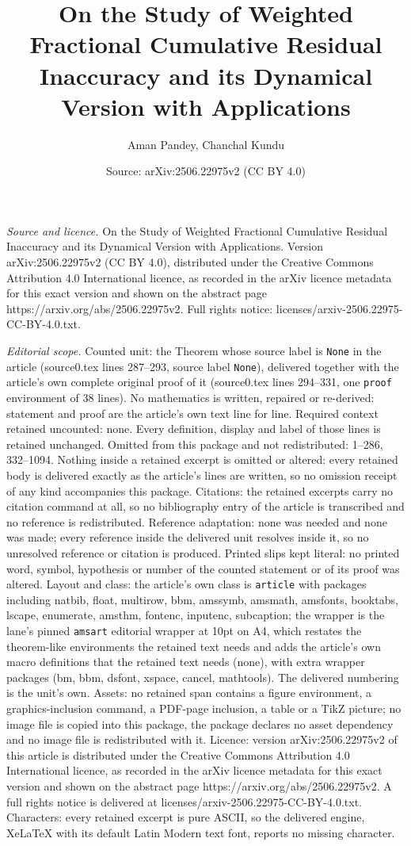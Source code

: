 \documentclass[10pt,a4paper]{amsart}
\title[On the Study of Weighted Fractional Cumulative Residual Inac]{On the Study of Weighted Fractional Cumulative Residual Inaccuracy and its Dynamical Version with Applications}
\author{Aman Pandey, Chanchal Kundu}
\date{Source: arXiv:2506.22975v2 (CC BY 4.0)}
\begin{document}
\maketitle

\noindent\emph{Source and licence.} On the Study of Weighted Fractional Cumulative Residual Inaccuracy and its Dynamical Version with Applications. Version arXiv:2506.22975v2 (CC BY 4.0), distributed under the Creative Commons Attribution 4.0 International licence, as recorded in the arXiv licence metadata for this exact version and shown on the abstract page https://arxiv.org/abs/2506.22975v2. Full rights notice: licenses/arxiv-2506.22975-CC-BY-4.0.txt.\par\smallskip

\noindent\textit{Editorial scope.} Counted unit: the Theorem whose source label is \texttt{None} in the article (source0.tex lines 287--293, source label \texttt{None}), delivered together with the article's own complete original proof of it (source0.tex lines 294--331, one \texttt{proof} environment of 38 lines). No mathematics is written, repaired or re-derived: statement and proof are the article's own text line for line. Required context retained uncounted: none. Every definition, display and label of those lines is retained unchanged. Omitted from this package and not redistributed: 1--286, 332--1094. Nothing inside a retained excerpt is omitted or altered: every retained body is delivered exactly as the article's lines are written, so no omission receipt of any kind accompanies this package. Citations: the retained excerpts carry no citation command at all, so no bibliography entry of the article is transcribed and no reference is redistributed. Reference adaptation: none was needed and none was made; every reference inside the delivered unit resolves inside it, so no unresolved reference or citation is produced. Printed slips kept literal: no printed word, symbol, hypothesis or number of the counted statement or of its proof was altered. Layout and class: the article's own class is \texttt{article} with packages including natbib, float, multirow, bbm, amssymb, amsmath, amsfonts, booktabs, lscape, enumerate, amsthm, fontenc, inputenc, subcaption; the wrapper is the lane's pinned \texttt{amsart} editorial wrapper at 10pt on A4, which restates the theorem-like environments the retained text needs and adds the article's own macro definitions that the retained text needs (none), with extra wrapper packages (bm, bbm, dsfont, xspace, cancel, mathtools). The delivered numbering is the unit's own. Assets: no retained span contains a figure environment, a graphics-inclusion command, a PDF-page inclusion, a table or a TikZ picture; no image file is copied into this package, the package declares no asset dependency and no image file is redistributed with it. Licence: version arXiv:2506.22975v2 of this article is distributed under the Creative Commons Attribution 4.0 International licence, as recorded in the arXiv licence metadata for this exact version and shown on the abstract page https://arxiv.org/abs/2506.22975v2. A full rights notice is delivered at licenses/arxiv-2506.22975-CC-BY-4.0.txt. Characters: every retained excerpt is pure ASCII, so the delivered engine, XeLaTeX with its default Latin Modern text font, reports no missing character.
\end{document}
